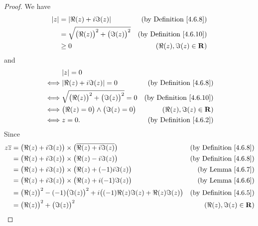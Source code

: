 \begin{proof}
    We have
    \begin{align*}
        \abs*{z} & = \abs*{\Re(z) + i \Im(z)}                       & \text{(by Definition \ref{4.6.8})}  \\
                 & = \sqrt{\big(\Re(z)\big)^2 + \big(\Im(z)\big)^2} & \text{(by Definition \ref{4.6.10})} \\
                 & \geq 0                                           & (\Re(z), \Im(z) \in \mathbf{R})
    \end{align*}
    and
    \begin{align*}
             & \abs*{z} = 0                                                                             \\
        \iff & \abs*{\Re(z) + i \Im(z)} = 0                       & \text{(by Definition \ref{4.6.8})}  \\
        \iff & \sqrt{\big(\Re(z)\big)^2 + \big(\Im(z)\big)^2} = 0 & \text{(by Definition \ref{4.6.10})} \\
        \iff & \big(\Re(z) = 0\big) \land \big(\Im(z) = 0\big)    & (\Re(z), \Im(z) \in \mathbf{R})     \\
        \iff & z = 0.                                             & \text{(by Definition \ref{4.6.2})}
    \end{align*}
    Since
    \begin{align*}
        z \overline{z} & = \big(\Re(z) + i \Im(z)\big) \times \big(\overline{\Re(z) + i \Im(z)}\big)                     & \text{(by Definition \ref{4.6.8})}      \\
                       & = \big(\Re(z) + i \Im(z)\big) \times \big(\Re(z) - i \Im(z)\big)                                & \text{(by Definition \ref{4.6.8})}      \\
                       & = \big(\Re(z) + i \Im(z)\big) \times \big(\Re(z) + (-1) i \Im(z)\big)                           & \text{(by Lemma \ref{4.6.7})}           \\
                       & = \big(\Re(z) + i \Im(z)\big) \times \big(\Re(z) + i (-1) \Im(z)\big)                           & \text{(by Lemma \ref{4.6.6})}           \\
                       & = \big(\Re(z)\big)^2 - (-1) \big(\Im(z)\big)^2 + i \big((-1) \Re(z) \Im(z) + \Re(z) \Im(z)\big) & \text{(by Definition \ref{4.6.5})}      \\
                       & = \big(\Re(z)\big)^2 + \big(\Im(z)\big)^2                                                       & (\Re(z), \Im(z) \in \mathbf{R})         \\

\end{align*}
\end{proof}
